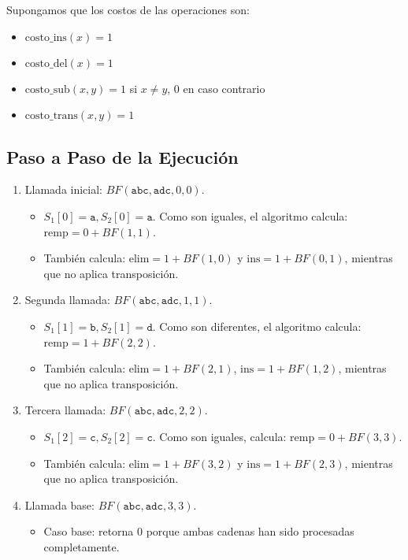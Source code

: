 Supongamos que los costos de las operaciones son:
\begin{itemize}
    \item \( \text{costo\_ins}(x) = 1 \)
    \item \( \text{costo\_del}(x) = 1 \)
    \item \( \text{costo\_sub}(x, y) = 1 \) si \( x \neq y \), \( 0 \) en caso contrario
    \item \( \text{costo\_trans}(x, y) = 1 \)
\end{itemize}

\subsection*{Paso a Paso de la Ejecución}

\begin{enumerate}
    \item Llamada inicial: \( BF(\texttt{abc}, \texttt{adc}, 0, 0) \).
    \begin{itemize}
        \item \( S_1[0] = \texttt{a}, S_2[0] = \texttt{a} \). Como son iguales, el algoritmo calcula:  
        \( \text{remp} = 0 + BF(1, 1) \).
        \item También calcula:  
        \( \text{elim} = 1 + BF(1, 0) \) y \( \text{ins} = 1 + BF(0, 1) \), mientras que no aplica transposición.
    \end{itemize}

    \item Segunda llamada: \( BF(\texttt{abc}, \texttt{adc}, 1, 1) \).
    \begin{itemize}
        \item \( S_1[1] = \texttt{b}, S_2[1] = \texttt{d} \). Como son diferentes, el algoritmo calcula:  
        \( \text{remp} = 1 + BF(2, 2) \).
        \item También calcula:  
        \( \text{elim} = 1 + BF(2, 1) \),  
        \( \text{ins} = 1 + BF(1, 2) \), mientras que no aplica transposición.
    \end{itemize}

    \item Tercera llamada: \( BF(\texttt{abc}, \texttt{adc}, 2, 2) \).
    \begin{itemize}
        \item \( S_1[2] = \texttt{c}, S_2[2] = \texttt{c} \). Como son iguales, calcula:  
        \( \text{remp} = 0 + BF(3, 3) \).
        \item También calcula:  
        \( \text{elim} = 1 + BF(3, 2) \) y \( \text{ins} = 1 + BF(2, 3) \), mientras que no aplica transposición.
    \end{itemize}

    \item Llamada base: \( BF(\texttt{abc}, \texttt{adc}, 3, 3) \).
    \begin{itemize}
        \item Caso base: retorna 0 porque ambas cadenas han sido procesadas completamente.
    \end{itemize}
\end{enumerate}


